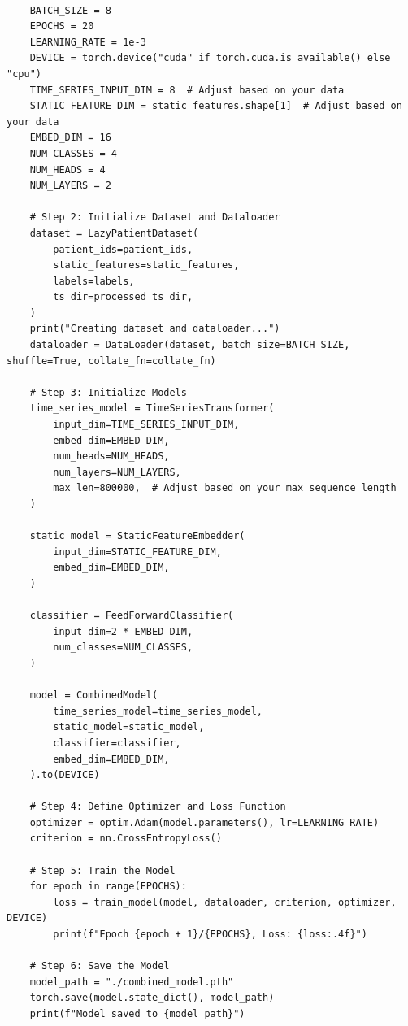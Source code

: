 \begin{appendices}
\begin{mdframed}
\begin{lstlisting}[breaklines=true]
    
    BATCH_SIZE = 8
    EPOCHS = 20
    LEARNING_RATE = 1e-3
    DEVICE = torch.device("cuda" if torch.cuda.is_available() else "cpu")
    TIME_SERIES_INPUT_DIM = 8  # Adjust based on your data
    STATIC_FEATURE_DIM = static_features.shape[1]  # Adjust based on your data
    EMBED_DIM = 16
    NUM_CLASSES = 4
    NUM_HEADS = 4
    NUM_LAYERS = 2

    # Step 2: Initialize Dataset and Dataloader
    dataset = LazyPatientDataset(
        patient_ids=patient_ids,
        static_features=static_features,
        labels=labels,
        ts_dir=processed_ts_dir,
    )
    print("Creating dataset and dataloader...")
    dataloader = DataLoader(dataset, batch_size=BATCH_SIZE, shuffle=True, collate_fn=collate_fn)

    # Step 3: Initialize Models
    time_series_model = TimeSeriesTransformer(
        input_dim=TIME_SERIES_INPUT_DIM,
        embed_dim=EMBED_DIM,
        num_heads=NUM_HEADS,
        num_layers=NUM_LAYERS,
        max_len=800000,  # Adjust based on your max sequence length
    )

    static_model = StaticFeatureEmbedder(
        input_dim=STATIC_FEATURE_DIM,
        embed_dim=EMBED_DIM,
    )

    classifier = FeedForwardClassifier(
        input_dim=2 * EMBED_DIM,
        num_classes=NUM_CLASSES,
    )

    model = CombinedModel(
        time_series_model=time_series_model,
        static_model=static_model,
        classifier=classifier,
        embed_dim=EMBED_DIM,
    ).to(DEVICE)

    # Step 4: Define Optimizer and Loss Function
    optimizer = optim.Adam(model.parameters(), lr=LEARNING_RATE)
    criterion = nn.CrossEntropyLoss()

    # Step 5: Train the Model
    for epoch in range(EPOCHS):
        loss = train_model(model, dataloader, criterion, optimizer, DEVICE)
        print(f"Epoch {epoch + 1}/{EPOCHS}, Loss: {loss:.4f}")

    # Step 6: Save the Model
    model_path = "./combined_model.pth"
    torch.save(model.state_dict(), model_path)
    print(f"Model saved to {model_path}")


    \end{lstlisting}
    \end{mdframed}

  
\end{appendices}